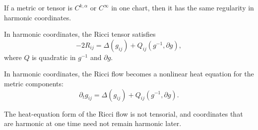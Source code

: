 \begin{lemma}
\label{ch03-lem-harmonic-coordinate-regularity}
If a metric or tensor is \(C^{k,\alpha}\) or \(C^\infty\) in one chart, then it has the same regularity in harmonic coordinates.
\end{lemma}

\begin{lemma}
\label{ch03-lem-ricci-in-harmonic-coordinates}
In harmonic coordinates, the Ricci tensor satisfies
\[
-2R_{ij}=\Delta(g_{ij})+Q_{ij}(g^{-1},\partial g),
\]
where \(Q\) is quadratic in \(g^{-1}\) and \(\partial g\).
\end{lemma}

\begin{corollary}
\label{ch03-cor-ricci-flow-heat-equation}
In harmonic coordinates, the Ricci flow becomes a nonlinear heat equation for the metric components:
\[
\partial_t g_{ij}=\Delta(g_{ij})+Q_{ij}(g^{-1},\partial g).
\]
\end{corollary}

\begin{remark}
\label{ch03-rem-harmonic-coordinate-caution}
The heat-equation form of the Ricci flow is not tensorial, and coordinates that are harmonic at one time need not remain harmonic later.
\end{remark}

